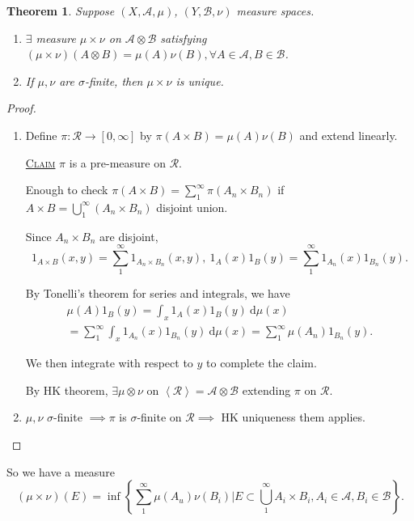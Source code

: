 \documentclass{report}
\newcommand{\cA}{\mathcal{A}}
\newcommand{\cB}{\mathcal{B}}
\newcommand{\cR}{\mathcal{R}}
\newcommand{\df}{\ \mathrm{d}}
\newcommand{\gen}[1]{\left\langle #1 \right\rangle}
\newcommand{\fancyem}[1]{\underline{\textsc{#1}}}
\newtheorem{theorem}{Theorem}[chapter]
\theoremstyle{definition}
\theoremstyle{remark}
\begin{document}
\begin{theorem}
	Suppose $(X, \cA, \mu)$, $(Y, \cB, \nu)$ measure spaces. 
	\begin{enumerate}
		\item $\exists$ measure $\mu \times \nu$ on $\cA \otimes \cB$ satisfying $(\mu \times \nu)(A \otimes B) = \mu(A)\nu(B), \forall A \in \cA, B \in \cB$.
		\item If $\mu, \nu$ are $\sigma$-finite, then $\mu \times \nu$ is unique.
	\end{enumerate}
\end{theorem}
\begin{proof}
	\begin{enumerate}
		\item Define $\pi: \mathcal{R} \to [0, \infty]$ by $\pi(A \times B) = \mu(A)\nu(B)$ and extend linearly.

		\fancyem{Claim} $\pi$ is a pre-measure on $\cR$.
	
		Enough to check $\displaystyle \pi(A \times B) = \sum_1^\infty \pi(A_n \times B_n)$ if $\displaystyle A \times B = \bigcup_{1}^\infty(A_n \times B_n)$ disjoint union.
	
		Since $A_n \times B_n$ are disjoint, \[1_{A \times B}(x, y) = \sum_1^\infty 1_{A_n \times B_n}(x, y),\ 1_A(x)1_B(y) = \sum_1^\infty1_{A_n}(x)1_{B_n}(y).\]
	
		By Tonelli's theorem for series and integrals, we have 
		\begin{multline*}
			\mu(A)1_B(y) = \int_x 1_A(x)1_B(y) \df \mu(x) \\ = \sum_1^\infty \int_x 1_{A_n}(x)1_{B_n}(y) \df \mu(x) = \sum_{1}^\infty \mu(A_n)1_{B_n}(y).
		\end{multline*}
			
		We then integrate with respect to $y$ to complete the claim.
	
		By HK theorem, $\exists \mu \otimes \nu$ on $\gen{\cR} = \cA \otimes \cB$ extending $\pi$ on $\cR$.

		\item $\mu, \nu$ $\sigma$-finite $\implies \pi$ is $\sigma$-finite on $\cR \implies$ HK uniqueness them applies. \qedhere
	\end{enumerate}
\end{proof}

So we have a measure 
\[
	(\mu \times \nu)(E) = \inf \left\lbrace\sum_{1}^\infty \mu(A_u)\nu(B_i) \biggr\rvert E \subset \bigcup_1^\infty A_i \times B_i, A_i \in \cA, B_i \in \cB \right\rbrace.
\]
\end{document}
